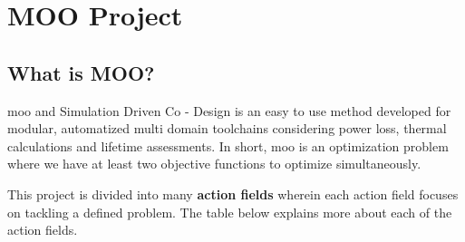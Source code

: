 \chapter{MOO Project}

\section{What is MOO?}
\acrfull{moo} \cite{moo} and Simulation Driven Co - Design is an easy to use method developed for modular, automatized multi domain toolchains considering power loss, thermal calculations and 
lifetime assessments. In short, \acrshort{moo} is an optimization problem where we have at least two objective functions to optimize simultaneously.

This project is divided into many \textbf{action fields} wherein each action field focuses on tackling a defined problem. The table below explains more
about each of the action fields.


